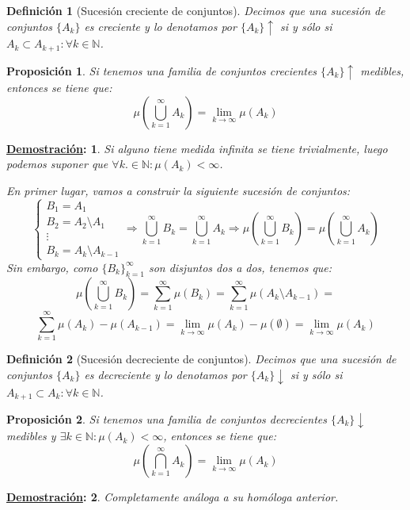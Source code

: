 \documentclass[10pt,a4paper,openright]{book}
\theoremstyle{break}
\newtheorem*{defi}{Definición}
\newtheorem*{prop}{Proposición}
\newtheorem*{demo}{\underline{Demostración}:}
\begin{document}
\begin{defi}[Sucesión creciente de conjuntos]
Decimos que una sucesión de conjuntos $\{A_k\}$ es creciente y lo denotamos por $\{A_k\}\uparrow$ si y sólo si $A_k \subset A_{k+1} : \forall k  \in \mathbb{N}$.
\end{defi}

\begin{prop}
Si tenemos una familia de conjuntos crecientes $\{A_k\}\uparrow$ medibles, entonces se tiene que:
$$\mu\left(\bigcup_{k=1}^\infty A_k\right) = \lim_{k\rightarrow \infty} \mu(A_k)$$
\end{prop}
\begin{demo}
Si alguno tiene medida infinita se tiene trivialmente, luego podemos suponer que $\forall k .\in \mathbb{N}: \mu(A_k) < \infty$.

En primer lugar, vamos a construir la siguiente sucesión de conjuntos:
$$\begin{cases}
B_1 = A_1 \\
B_2 = A_2\setminus A_1 \\
\vdots \\ 
B_k = A_k \setminus A_{k-1}
\end{cases} \Rightarrow \bigcup_{k=1}^\infty B_k = \bigcup_{k=1}^\infty A_k \Rightarrow \mu\left(\bigcup_{k=1}^\infty B_k\right) = \mu\left(\bigcup_{k=1}^\infty A_k\right)$$
Sin embargo, como $\{B_k\}_{k=1}^\infty$ son disjuntos dos a dos, tenemos que:
$$\mu\left(\bigcup_{k=1}^\infty B_k\right) = \sum_{k=1}^\infty \mu(B_k) =\sum_{k=1}^\infty \mu(A_k\setminus A_{k-1}) =$$
$$\sum_{k=1}^\infty \mu(A_k)- \mu(A_{k-1}) = \lim_{k\rightarrow \infty} \mu(A_k) - \mu(\emptyset) = \lim_{k\rightarrow \infty}\mu(A_k)$$
\end{demo}

\begin{defi}[Sucesión decreciente de conjuntos]
Decimos que una sucesión de conjuntos $\{A_k\}$ es decreciente y lo denotamos por $\{A_k\}\downarrow$ si y sólo si $A_{k+1} \subset A_{k} : \forall k  \in \mathbb{N}$.
\end{defi}

\begin{prop}
Si tenemos una familia de conjuntos decrecientes $\{A_k\}\downarrow$ medibles y $\exists k \in \mathbb N : \mu(A_k) < \infty$, entonces se tiene que:
$$\mu\left(\bigcap_{k=1}^\infty A_k\right) = \lim_{k\rightarrow \infty} \mu(A_k)$$
\end{prop}
\begin{demo}
Completamente análoga a su homóloga anterior.
\end{demo}
\end{document}
